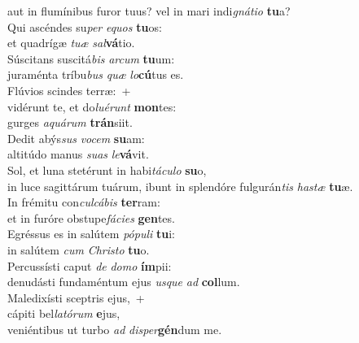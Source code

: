 \evenverse aut in flumínibus furor tuus? vel in mari indi\textit{gná}\textit{ti}\textit{o} \textbf{tu}a?\\
\oddverse Qui ascéndes su\textit{per} \textit{e}\textit{quos} \textbf{tu}os:~\*\\
\oddverse et quadrígæ \textit{tu}\textit{æ} \textit{sal}\textbf{vá}tio.\\
\evenverse Súscitans suscitá\textit{bis} \textit{ar}\textit{cum} \textbf{tu}um:~\*\\
\evenverse juraménta tríbu\textit{bus} \textit{quæ} \textit{lo}\textbf{cú}tus es.\\
\oddverse Flúvios scindes terræ:~+\\
\oddverse  vidérunt te, et do\textit{lu}\textit{é}\textit{runt} \textbf{mon}tes:~\*\\
\oddverse gurges \textit{a}\textit{quá}\textit{rum} \textbf{trán}siit.\\
\evenverse Dedit abýs\textit{sus} \textit{vo}\textit{cem} \textbf{su}am:~\*\\
\evenverse altitúdo manus \textit{su}\textit{as} \textit{le}\textbf{vá}vit.\\
\oddverse Sol, et luna stetérunt in habi\textit{tá}\textit{cu}\textit{lo} \textbf{su}o,~\*\\
\oddverse in luce sagittárum tuárum, ibunt in splendóre fulgurán\textit{tis} \textit{ha}\textit{stæ} \textbf{tu}æ.\\
\evenverse In frémitu con\textit{cul}\textit{cá}\textit{bis} \textbf{ter}ram:~\*\\
\evenverse et in furóre obstupe\textit{fá}\textit{ci}\textit{es} \textbf{gen}tes.\\
\oddverse Egréssus es in salútem \textit{pó}\textit{pu}\textit{li} \textbf{tu}i:~\*\\
\oddverse in salútem \textit{cum} \textit{Chri}\textit{sto} \textbf{tu}o.\\
\evenverse Percussísti caput \textit{de} \textit{do}\textit{mo} \textbf{ím}pii:~\*\\
\evenverse denudásti fundaméntum ejus \textit{us}\textit{que} \textit{ad} \textbf{col}lum.\\
\oddverse Maledixísti sceptris ejus,~+\\
\oddverse  cápiti bel\textit{la}\textit{tó}\textit{rum} \textbf{e}jus,~\*\\
\oddverse veniéntibus ut turbo \textit{ad} \textit{di}\textit{sper}\textbf{gén}dum me.\\
